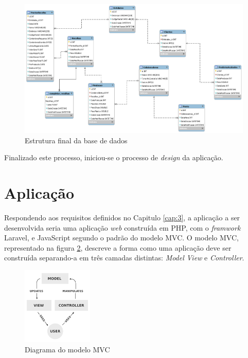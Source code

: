 \begin{figure}[htbp] 
	\begin{center}
		\includegraphics[width=\textwidth,keepaspectratio]{figuras/DB_Model/new.png}
		\caption{Estrutura final da base de dados}
		\label{fig:db_model} 
	\end{center}
\end{figure}

Finalizado este processo, iniciou-se o processo de \textit{design} da aplicação.

\section{Aplicação}
Respondendo aos requisitos definidos no Capitulo \ref{cap:3}, a aplicação a ser desenvolvida seria uma aplicação \textit{web} construída em PHP, com o \textit{framwork} Laravel, e JavaScript segundo o padrão do modelo MVC. O modelo MVC, representado na figura \ref{fig:mvc}, descreve a forma como uma aplicação deve ser construída separando-a em três camadas distintas: \textit{Model} \textit{View} e \textit{Controller}.
\begin{figure}[H] 
	\begin{center}
		\includegraphics[width=0.30\textwidth,keepaspectratio]{figuras/mvc.png}
		\caption{Diagrama do modelo MVC}
		\label{fig:mvc} 
	\end{center}
\end{figure}

